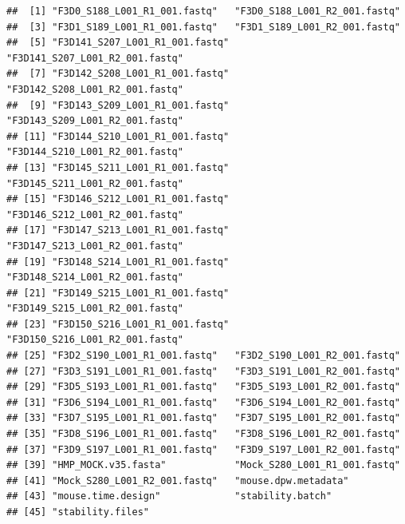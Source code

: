 \documentclass[
]{book}
\begin{document}
\begin{verbatim}
##  [1] "F3D0_S188_L001_R1_001.fastq"   "F3D0_S188_L001_R2_001.fastq"  
##  [3] "F3D1_S189_L001_R1_001.fastq"   "F3D1_S189_L001_R2_001.fastq"  
##  [5] "F3D141_S207_L001_R1_001.fastq" "F3D141_S207_L001_R2_001.fastq"
##  [7] "F3D142_S208_L001_R1_001.fastq" "F3D142_S208_L001_R2_001.fastq"
##  [9] "F3D143_S209_L001_R1_001.fastq" "F3D143_S209_L001_R2_001.fastq"
## [11] "F3D144_S210_L001_R1_001.fastq" "F3D144_S210_L001_R2_001.fastq"
## [13] "F3D145_S211_L001_R1_001.fastq" "F3D145_S211_L001_R2_001.fastq"
## [15] "F3D146_S212_L001_R1_001.fastq" "F3D146_S212_L001_R2_001.fastq"
## [17] "F3D147_S213_L001_R1_001.fastq" "F3D147_S213_L001_R2_001.fastq"
## [19] "F3D148_S214_L001_R1_001.fastq" "F3D148_S214_L001_R2_001.fastq"
## [21] "F3D149_S215_L001_R1_001.fastq" "F3D149_S215_L001_R2_001.fastq"
## [23] "F3D150_S216_L001_R1_001.fastq" "F3D150_S216_L001_R2_001.fastq"
## [25] "F3D2_S190_L001_R1_001.fastq"   "F3D2_S190_L001_R2_001.fastq"  
## [27] "F3D3_S191_L001_R1_001.fastq"   "F3D3_S191_L001_R2_001.fastq"  
## [29] "F3D5_S193_L001_R1_001.fastq"   "F3D5_S193_L001_R2_001.fastq"  
## [31] "F3D6_S194_L001_R1_001.fastq"   "F3D6_S194_L001_R2_001.fastq"  
## [33] "F3D7_S195_L001_R1_001.fastq"   "F3D7_S195_L001_R2_001.fastq"  
## [35] "F3D8_S196_L001_R1_001.fastq"   "F3D8_S196_L001_R2_001.fastq"  
## [37] "F3D9_S197_L001_R1_001.fastq"   "F3D9_S197_L001_R2_001.fastq"  
## [39] "HMP_MOCK.v35.fasta"            "Mock_S280_L001_R1_001.fastq"  
## [41] "Mock_S280_L001_R2_001.fastq"   "mouse.dpw.metadata"           
## [43] "mouse.time.design"             "stability.batch"              
## [45] "stability.files"
\end{verbatim}
\end{document}
